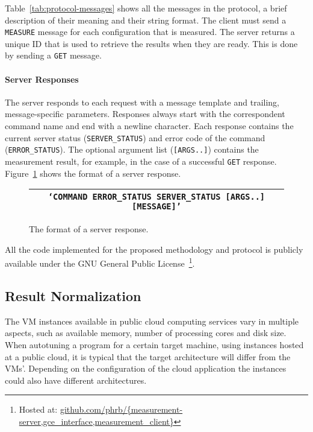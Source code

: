 Table~\ref{tab:protocol-messages} shows all the messages in the protocol, a
brief description of their meaning and their string format. The client must
send a \texttt{\footnotesize MEASURE} message for each configuration that is
measured. The server returns a unique ID that is used to retrieve the results
when they are ready. This is done by sending a \texttt{\footnotesize GET}
message.

\paragraph{Server Responses}

The server responds to each request with a message template and trailing,
message-specific parameters. Responses always start with the correspondent
command name and end with a newline character.  Each response contains the
current server status (\texttt{\footnotesize SERVER\_STATUS}) and error code of
the command (\texttt{\footnotesize ERROR\_STATUS}).  The optional argument list
(\texttt{\footnotesize [ARGS..]}) contains the measurement result, for example,
in the case of a successful \texttt{\footnotesize GET} response.
Figure~\ref{fig:response-template} shows the format of a server response.

\begin{figure}[htpb]
    \centering
    \footnotesize
    \begin{tabular}{@{}c@{}}
        \toprule
        {\tt \lq{}COMMAND ERROR\_STATUS SERVER\_STATUS [ARGS..] [MESSAGE]\rq{}} \\ \bottomrule
    \end{tabular}
    \caption{The format of a server response.}
    \label{fig:response-template}
\end{figure}

All the code implemented for the proposed methodology and protocol is publicly
available under the GNU General Public License~\footnote{Hosted at: \url{github.com/phrb/{measurement-server,gce_interface,measurement_client}}}.

\subsection{Result Normalization}
\label{sec:norm}

The VM instances available in public cloud computing services vary in multiple
aspects, such as available memory, number of processing cores and disk size.
When autotuning a program for a certain target machine, using instances hosted
at a public cloud, it is typical that the target architecture will differ from
the VMs'. Depending on the configuration of the cloud application the instances
could also have different architectures.

